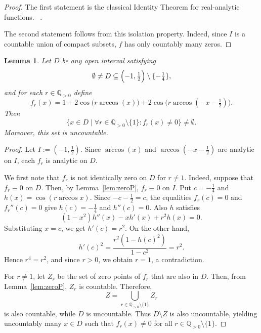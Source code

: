 \documentclass{amsart}
\newtheorem{lem}[thm]{Lemma}
\theoremstyle{definition}
\begin{document}
\begin{proof}
The first statement is the classical Identity Theorem for real-analytic functions. ~\cite[Corollary 1.2.7]{KP02}.

The second statement follows from this isolation property. Indeed, since $I$ is a countable union of compact subsets, $f$ has only countably many zeros.
\end{proof}
  

\begin{lem}\label{lem:singleton}
    Let $D$ be any open interval satisfying
    \[\emptyset\neq D\subseteq\Bigl(-1,\tfrac12\Bigr)\setminus\{-\tfrac14\},\]
  and for each $r\in\mathbb{Q}_{>0}$ define
  \[f_r(x)=1+2\cos\bigl(r\arccos(x)\bigr)+2\cos\bigl(r\arccos(-x-\tfrac12)\bigr).
  \]
  Then
  \[\{x\in D\mid \forall r\in\mathbb{Q}_{>0}\setminus\{1\}:f_r(x)\neq0\}\neq\emptyset.
  \]
  Moreover, this set is uncountable.
\end{lem}

\begin{proof}
Let \(I:=(-1,\tfrac12)\). Since \(\arccos(x)\) and
\(\arccos(-x-\tfrac12)\) are analytic on \(I\), each \(f_r\) is analytic
on \(D\).

We first note that \(f_r\) is not identically zero on \(D\) for
\(r\neq1\). Indeed, suppose that \(f_r\equiv0\) on \(D\). Then, by
Lemma~\ref{lem:zeroP}, \(f_r\equiv0\) on \(I\). Put
\(c=-\tfrac14\) and \(h(x)=\cos(r\arccos x)\). Since
\(-c-\tfrac12=c\), the equalities \(f_r(c)=0\) and \(f_r''(c)=0\) give
\(h(c)=-\tfrac14\) and \(h''(c)=0\). Also \(h\) satisfies
\[
(1-x^2)h''(x)-xh'(x)+r^2h(x)=0.
\]
Substituting \(x=c\), we get \(h'(c)=r^2\). On the other hand,
\[
h'(c)^2
=
\frac{r^2(1-h(c)^2)}{1-c^2}
=
r^2.
\]
Hence \(r^4=r^2\), and since \(r>0\), we obtain \(r=1\), a contradiction.

For \(r\neq1\), let \(Z_r\) be the set of zero points of \(f_r\) that
are also in \(D\). Then, from Lemma~\ref{lem:zeroP}, \(Z_r\) is countable.
Therefore,
\[
Z=\bigcup_{r\in\mathbb{Q}_{>0}\setminus\{1\}} Z_r
\]
is also countable, while \(D\) is uncountable. Thus \(D\setminus Z\) is
also uncountable, yielding uncountably many \(x\in D\) such that
\(f_r(x)\neq0\) for all \(r\in\mathbb{Q}_{>0}\setminus\{1\}\).
\end{proof}
 
\end{document}
